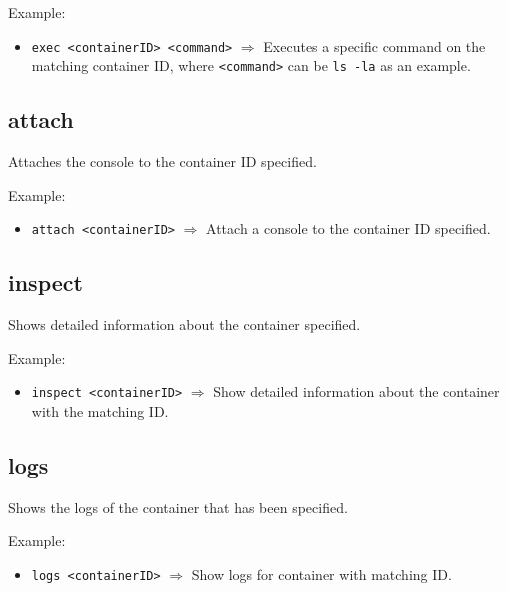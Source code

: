\documentclass[a4paper, 12pt]{article}
\begin{document}
\vspace{0.5em}
Example:
\begin{itemize}
	\item \texttt{exec <containerID> <command>} $\Rightarrow$ Executes a specific command
	on the matching container ID, where \texttt{<command>} can be \texttt{ls -la}
	as an example.
\end{itemize}

\subsection{\label{sec:attach}attach}

Attaches the console to the container ID specified.

\vspace{0.5em}
Example:
\begin{itemize}
	\item \texttt{attach <containerID>} $\Rightarrow$ Attach a console to the container ID
	specified.
\end{itemize}

\subsection{inspect}

Shows detailed information about the container specified.

\vspace{0.5em}
Example:
\begin{itemize}
	\item \texttt{inspect <containerID>} $\Rightarrow$ Show detailed information about the
	container with the matching ID.
\end{itemize}

\subsection{logs}

Shows the logs of the container that has been specified.

\vspace{0.5em}
Example:
\begin{itemize}
	\item \texttt{logs <containerID>} $\Rightarrow$ Show logs for container with matching ID.
\end{itemize}
\end{document}
